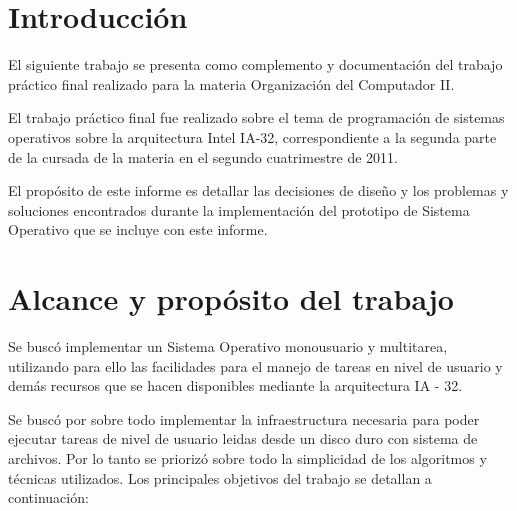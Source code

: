 \section{Introducci\'on}

El siguiente trabajo se presenta como complemento y documentaci\'on
del trabajo pr\'actico final realizado para la materia Organizaci\'on
del Computador II. 

El trabajo pr\'actico final fue realizado sobre el tema de programaci\'on
de sistemas operativos sobre la arquitectura Intel IA-32, correspondiente
a la segunda parte de la cursada de la materia en el segundo cuatrimestre
de 2011.

El prop\'osito de este informe es detallar las decisiones de dise\~no
y los problemas y soluciones encontrados durante la implementaci\'on del
prototipo de Sistema Operativo que se incluye con este informe.

\section{Alcance y prop\'osito del trabajo}

Se busc\'o implementar un Sistema Operativo monousuario y multitarea,
utilizando para ello las facilidades para el manejo de tareas en nivel de
usuario y dem\'as recursos que se hacen disponibles mediante la arquitectura
IA - 32. 

Se busc\'o por sobre todo implementar la infraestructura necesaria para poder
ejecutar tareas de nivel de usuario leidas desde un disco duro con sistema de
archivos. Por lo tanto se prioriz\'o sobre todo la simplicidad de los algoritmos
y t\'ecnicas utilizados. Los principales objetivos del trabajo se detallan a
continuaci\'on:

